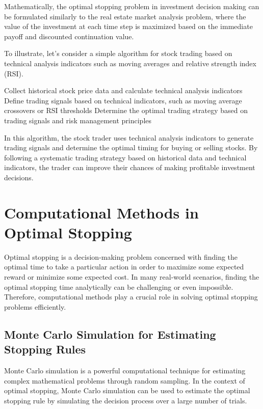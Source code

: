 \documentclass[12pt]{book} %
\begin{document}
Mathematically, the optimal stopping problem in investment decision making can be formulated similarly to the real estate market analysis problem, where the value of the investment at each time step is maximized based on the immediate payoff and discounted continuation value.

To illustrate, let's consider a simple algorithm for stock trading based on technical analysis indicators such as moving averages and relative strength index (RSI).
\FloatBarrier
\begin{algorithm}
\caption{Optimal Stock Trading Strategy}
\begin{algorithmic}[1]
\State Collect historical stock price data and calculate technical analysis indicators
\State Define trading signals based on technical indicators, such as moving average crossovers or RSI thresholds
\State Determine the optimal trading strategy based on trading signals and risk management principles
\end{algorithmic}
\end{algorithm}
\FloatBarrier
In this algorithm, the stock trader uses technical analysis indicators to generate trading signals and determine the optimal timing for buying or selling stocks. By following a systematic trading strategy based on historical data and technical indicators, the trader can improve their chances of making profitable investment decisions.


\section{Computational Methods in Optimal Stopping}

Optimal stopping is a decision-making problem concerned with finding the optimal time to take a particular action in order to maximize some expected reward or minimize some expected cost. In many real-world scenarios, finding the optimal stopping time analytically can be challenging or even impossible. Therefore, computational methods play a crucial role in solving optimal stopping problems efficiently.

\subsection{Monte Carlo Simulation for Estimating Stopping Rules}

Monte Carlo simulation is a powerful computational technique for estimating complex mathematical problems through random sampling. In the context of optimal stopping, Monte Carlo simulation can be used to estimate the optimal stopping rule by simulating the decision process over a large number of trials.
\end{document}
